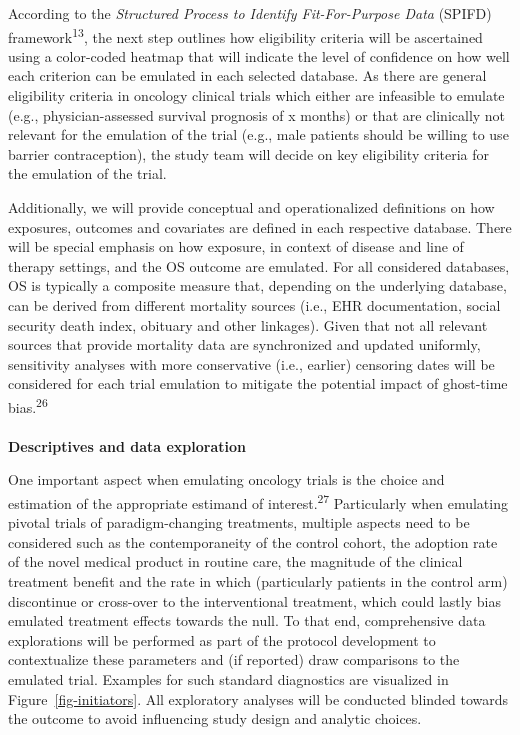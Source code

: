 \documentclass[
  letterpaper,
  DIV=11,
  numbers=noendperiod]{scrartcl}
\makeatletter
\let\oldparagraph\paragraph
\renewcommand{\paragraph}{
    \@ifstar
      \xxxParagraphStar
      \xxxParagraphNoStar
  }
\newcommand{\xxxParagraphStar}[1]{\oldparagraph*{#1}\mbox{}}
\newcommand{\xxxParagraphNoStar}[1]{\oldparagraph{#1}\mbox{}}
\makeatother
\begin{document}
According to the \emph{Structured Process to Identify Fit-For-Purpose
Data} (SPIFD) framework\textsuperscript{13}, the next step outlines how
eligibility criteria will be ascertained using a color-coded heatmap
that will indicate the level of confidence on how well each criterion
can be emulated in each selected database. As there are general
eligibility criteria in oncology clinical trials which either are
infeasible to emulate (e.g., physician-assessed survival prognosis of x
months) or that are clinically not relevant for the emulation of the
trial (e.g., male patients should be willing to use barrier
contraception), the study team will decide on key eligibility criteria
for the emulation of the trial.

Additionally, we will provide conceptual and operationalized definitions
on how exposures, outcomes and covariates are defined in each respective
database. There will be special emphasis on how exposure, in context of
disease and line of therapy settings, and the OS outcome are emulated.
For all considered databases, OS is typically a composite measure that,
depending on the underlying database, can be derived from different
mortality sources (i.e., EHR documentation, social security death index,
obituary and other linkages). Given that not all relevant sources that
provide mortality data are synchronized and updated uniformly,
sensitivity analyses with more conservative (i.e., earlier) censoring
dates will be considered for each trial emulation to mitigate the
potential impact of ghost-time bias.\textsuperscript{26}

\paragraph{\texorpdfstring{\textbf{Descriptives and data
exploration}}{Descriptives and data exploration}}\label{descriptives-and-data-exploration}

One important aspect when emulating oncology trials is the choice and
estimation of the appropriate estimand of interest.\textsuperscript{27}
Particularly when emulating pivotal trials of paradigm-changing
treatments, multiple aspects need to be considered such as the
contemporaneity of the control cohort, the adoption rate of the novel
medical product in routine care, the magnitude of the clinical treatment
benefit and the rate in which (particularly patients in the control arm)
discontinue or cross-over to the interventional treatment, which could
lastly bias emulated treatment effects towards the null. To that end,
comprehensive data explorations will be performed as part of the
protocol development to contextualize these parameters and (if reported)
draw comparisons to the emulated trial. Examples for such standard
diagnostics are visualized in Figure~\ref{fig-initiators}. All
exploratory analyses will be conducted blinded towards the outcome to
avoid influencing study design and analytic choices.
\end{document}
